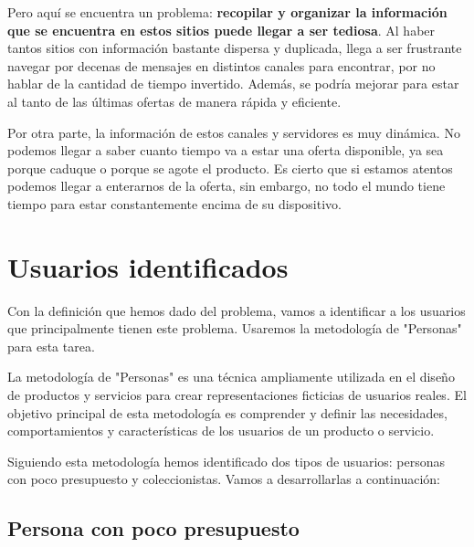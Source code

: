 Pero aquí se encuentra un problema: \textbf{recopilar y organizar la información 
que se encuentra en estos sitios puede llegar a ser tediosa}. Al haber tantos 
sitios con información bastante dispersa y duplicada, llega a ser frustrante 
navegar por decenas de mensajes en distintos canales para encontrar, por no hablar 
de la cantidad de tiempo invertido. Además, se podría mejorar para estar al tanto 
de las últimas ofertas de manera rápida y eficiente.

Por otra parte, la información de estos canales y servidores es muy dinámica. No 
podemos llegar a saber cuanto tiempo va a estar una oferta disponible, ya sea 
porque caduque o porque se agote el producto. Es cierto que si estamos atentos 
podemos llegar a enterarnos de la oferta, sin embargo, no todo el mundo tiene tiempo 
para estar constantemente encima de su dispositivo.

\section{Usuarios identificados}

Con la definición que hemos dado del problema, vamos a identificar a los usuarios 
que principalmente tienen este problema. Usaremos la metodología de "Personas" para 
esta tarea.

La metodología de "Personas" es una técnica ampliamente utilizada en el diseño de 
productos y servicios para crear representaciones ficticias de usuarios reales. El 
objetivo principal de esta metodología es comprender y definir las necesidades, 
comportamientos y características de los usuarios de un producto o servicio.

Siguiendo esta metodología hemos identificado dos tipos de usuarios: personas con 
poco presupuesto y coleccionistas. Vamos a desarrollarlas a continuación:

\subsection{Persona con poco presupuesto}

